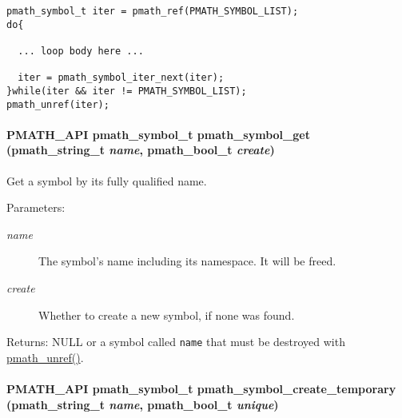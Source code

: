 \begin{Code}\begin{verbatim}pmath_symbol_t iter = pmath_ref(PMATH_SYMBOL_LIST);
do{
  
  ... loop body here ...
  
  iter = pmath_symbol_iter_next(iter);
}while(iter && iter != PMATH_SYMBOL_LIST);
pmath_unref(iter);
\end{verbatim}
\end{Code}

 \hypertarget{group__symbols_g0ccb42b30fcf6ee77d91241222f5c033}{
\paragraph[{pmath\_\-symbol\_\-get}]{\setlength{\rightskip}{0pt plus 5cm}PMATH\_\-API {\bf pmath\_\-symbol\_\-t} pmath\_\-symbol\_\-get ({\bf pmath\_\-string\_\-t} {\em name}, \/  {\bf pmath\_\-bool\_\-t} {\em create})}\hfill}
\label{group__symbols_g0ccb42b30fcf6ee77d91241222f5c033}


Get a symbol by its fully qualified name. 

\begin{Desc}
\item[Parameters:]
\begin{description}
\item[{\em name}]The symbol's name including its namespace. It will be freed. \item[{\em create}]Whether to create a new symbol, if none was found. \end{description}
\end{Desc}
\begin{Desc}
\item[Returns:]NULL or a symbol called {\tt name} that must be destroyed with \hyperlink{classpmath__t_54e905402c38940687033b87eb8c6c9f}{pmath\_\-unref()}. \end{Desc}
\hypertarget{group__symbols_g6f088bc8c667dfe91087dc4ace6d18c1}{
\paragraph[{pmath\_\-symbol\_\-create\_\-temporary}]{\setlength{\rightskip}{0pt plus 5cm}PMATH\_\-API {\bf pmath\_\-symbol\_\-t} pmath\_\-symbol\_\-create\_\-temporary ({\bf pmath\_\-string\_\-t} {\em name}, \/  {\bf pmath\_\-bool\_\-t} {\em unique})}\hfill}
\label{group__symbols_g6f088bc8c667dfe91087dc4ace6d18c1}


